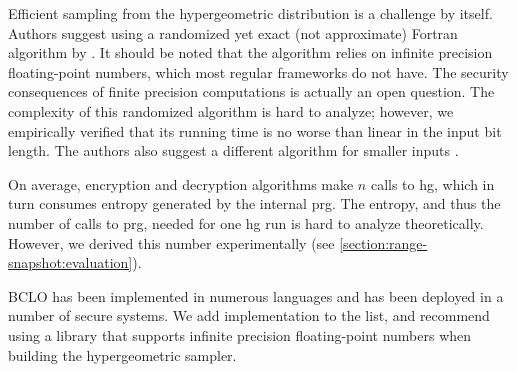 		Efficient sampling from the hypergeometric distribution is a challenge by itself.
		Authors suggest using a randomized yet exact (not approximate) Fortran algorithm by \textcite{hg-sampler}.
		It should be noted that the algorithm relies on infinite precision floating-point numbers, which most regular frameworks do not have.
		The security consequences of finite precision computations is actually an open question.
		The complexity of this randomized algorithm is hard to analyze; however, we empirically verified that its running time is no worse than linear in the input bit length.
		The authors also suggest a different algorithm for smaller inputs \cite{hg-sampler-small}.

		On average, encryption and decryption algorithms make $n$ calls to \acrshort{hg}, which in turn consumes entropy generated by the internal \acrshort{prg}.
		The entropy, and thus the number of calls to \acrshort{prg}, needed for one \acrshort{hg} run is hard to analyze theoretically.
		However, we derived this number experimentally (see \cref{section:range-snapshot:evaluation}).

		BCLO has been implemented in numerous languages and has been deployed in a number of secure systems.
		We add {\Csharp} implementation to the list, and recommend using a library that supports infinite precision floating-point numbers when building the hypergeometric sampler.
